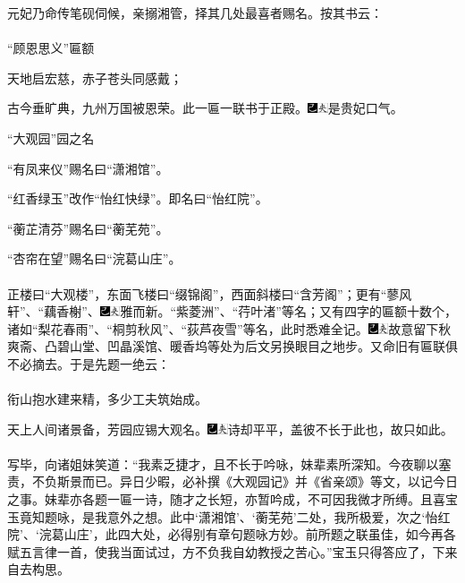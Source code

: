 元妃乃命传笔砚伺候，亲搦湘管，择其几处最喜者赐名。按其书云：
\\
\\
\indent
“顾恩思义”{\small 匾额}

天地启宏慈，赤子苍头同感戴；

古今垂旷典，九州万国被恩荣。{\small 此一匾一联书于正殿。{\includegraphics[width=3mm]{../Images/00003}\includegraphics[width=3mm]{../Images/00012}\footnotesize \kaishu 是贵妃口气。}}

“大观园”{\small 园之名}

“有凤来仪”{\small 赐名曰“潇湘馆”。}

“红香绿玉”改作“怡红快绿”。{\small 即名曰“怡红院”。}

“蘅芷清芬”{\small 赐名曰“蘅芜苑”。}

“杏帘在望”{\small 赐名曰“浣葛山庄”。}
\\
\\
\indent
正楼曰“大观楼”，东面飞楼曰“缀锦阁”，西面斜楼曰“含芳阁”；更有“蓼风轩”、“藕香榭”、{\includegraphics[width=3mm]{../Images/00003}\includegraphics[width=3mm]{../Images/00012}\footnotesize \kaishu 雅而新。}“紫菱洲”、“荇叶渚”等名；又有四字的匾额十数个，诸如“梨花春雨”、“桐剪秋风”、“荻芦夜雪”等名，此时悉难全记。{\includegraphics[width=3mm]{../Images/00003}\includegraphics[width=3mm]{../Images/00012}\footnotesize \kaishu 故意留下秋爽斋、凸碧山堂、凹晶溪馆、暖香坞等处为后文另换眼目之地步。}又命旧有匾联俱不必摘去。于是先题一绝云：
\\
\\
\indent
衔山抱水建来精，多少工夫筑始成。

天上人间诸景备，芳园应锡大观名。{\includegraphics[width=3mm]{../Images/00003}\includegraphics[width=3mm]{../Images/00012}\footnotesize \kaishu 诗却平平，盖彼不长于此也，故只如此。}
\\
\\
\indent
写毕，向诸姐妹笑道：“我素乏捷才，且不长于吟咏，妹辈素所深知。今夜聊以塞责，不负斯景而已。异日少暇，必补撰《大观园记》并《省亲颂》等文，以记今日之事。妹辈亦各题一匾一诗，随才之长短，亦暂吟成，不可因我微才所缚。且喜宝玉竟知题咏，是我意外之想。此中‘潇湘馆’、‘蘅芜苑’二处，我所极爱，次之‘怡红院’、‘浣葛山庄’，此四大处，必得别有章句题咏方妙。前所题之联虽佳，如今再各赋五言律一首，使我当面试过，方不负我自幼教授之苦心。”宝玉只得答应了，下来自去构思。

